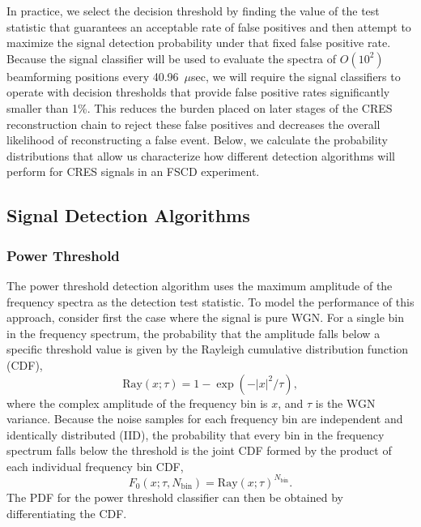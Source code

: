 In practice, we select the decision threshold by finding the value of the test statistic that guarantees an acceptable rate of false positives and then attempt to maximize the signal detection probability under that fixed false positive rate. Because the signal classifier will be used to evaluate the spectra of $O(10^2)$ beamforming positions every 40.96~$\mu$sec, we will require the signal classifiers to operate with decision thresholds that provide false positive rates significantly smaller than 1\%. This reduces the burden placed on later stages of the CRES reconstruction chain to reject these false positives and decreases the overall likelihood of reconstructing a false event. Below, we calculate the probability distributions that allow us characterize how different detection algorithms will perform for CRES signals in an FSCD experiment.


\subsection{Signal Detection Algorithms}
\label{sec:classifiers}

\subsubsection{Power Threshold}

The power threshold detection algorithm uses the maximum amplitude of the frequency spectra  as the detection test statistic. To model the performance of this approach, consider first the case where the signal is pure WGN. For a single bin in the frequency spectrum, the probability that the amplitude falls below a specific threshold value is given by the Rayleigh cumulative distribution function (CDF),
\begin{equation}
    \mathrm{Ray}(x;\tau)=1-\exp{\left(-|x|^2/\tau\right)},
\end{equation}
where the complex amplitude of the frequency bin is $x$, and $\tau$ is the WGN variance. Because the noise samples for each frequency bin are independent and identically distributed (IID), the probability that every bin in the frequency spectrum falls below the threshold is the joint CDF formed by the product of each individual frequency bin CDF,
\begin{equation}
    F_0(x;\tau, N_\mathrm{bin})=\mathrm{Ray}(x;\tau)^{N_\textrm{bin}}.
    \label{eq:fft_spectrum_cdf0}
\end{equation}
The PDF for the power threshold classifier can then be obtained by differentiating the CDF.

